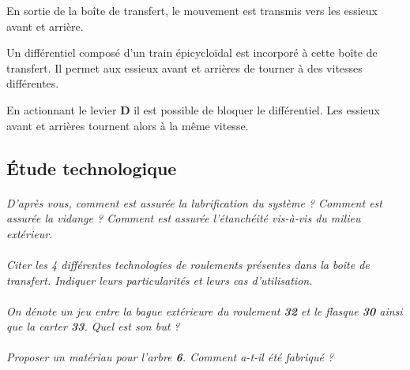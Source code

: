 \documentclass[11pt,oneside]{article}
\begin{document}
En sortie de la boîte de transfert, le mouvement est transmis vers les essieux avant et arrière. 

Un différentiel composé d'un train épicycloïdal est incorporé à cette boîte de transfert. Il permet aux essieux avant et arrières de tourner à des vitesses différentes. 

En actionnant le levier \textbf{D} il est possible de bloquer le différentiel. Les essieux avant et arrières tournent alors à la même vitesse. 

\subsection{Étude technologique}


\paragraph{}
\textit{D'après vous, comment est assurée la lubrification du système ? Comment est assurée la vidange ? Comment est assurée l'étanchéité vis-à-vis du milieu extérieur. }

\paragraph{}
\textit{Citer les 4 différentes technologies de roulements présentes dans la boîte de transfert. Indiquer leurs particularités et leurs cas d'utilisation.}

\paragraph{}
\textit{On dénote un jeu entre la bague extérieure du roulement \textbf{32} et le flasque \textbf{30} ainsi que la carter \textbf{33}. Quel est son but ?}

\paragraph{}
\textit{Proposer un matériau pour l'arbre \textbf{6}. Comment a-t-il été fabriqué ?}
%
%
%
%
%
\end{document}
